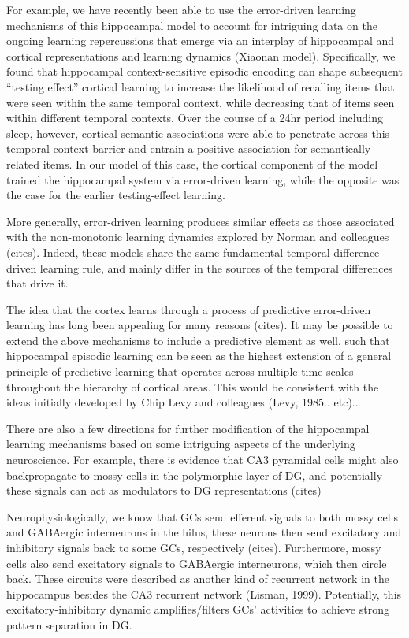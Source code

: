 \documentclass[11pt,twoside]{article}
\newif\myifpdf
\begin{document}
For example, we have recently been able to use the error-driven learning mechanisms of this hippocampal model to account for intriguing data on the ongoing learning repercussions that emerge via an interplay of hippocampal and cortical representations and learning dynamics (Xiaonan model).  Specifically, we found that hippocampal context-sensitive episodic encoding can shape subsequent “testing effect” cortical learning to increase the likelihood of recalling items that were seen within the same temporal context, while decreasing that of items seen within different temporal contexts.  Over the course of a 24hr period including sleep, however, cortical semantic associations were able to penetrate across this temporal context barrier and entrain a positive association for semantically-related items.  In our model of this case, the cortical component of the model trained the hippocampal system via error-driven learning, while the opposite was the case for the earlier testing-effect learning.

More generally, error-driven learning produces similar effects as those associated with the non-monotonic learning dynamics explored by Norman and colleagues (cites).  Indeed, these models share the same fundamental temporal-difference driven learning rule, and mainly differ in the sources of the temporal differences that drive it.

The idea that the cortex learns through a process of predictive error-driven learning has long been appealing for many reasons (cites).  It may be possible to extend the above mechanisms to include a predictive element as well, such that hippocampal episodic learning can be seen as the highest extension of a general principle of predictive learning that operates across multiple time scales throughout the hierarchy of cortical areas.  This would be consistent with the ideas initially developed by Chip Levy and colleagues (Levy, 1985.. etc)..

There are also a few directions for further modification of the hippocampal learning mechanisms based on some intriguing aspects of the underlying neuroscience.  For example, there is evidence that CA3 pyramidal cells might also backpropagate to mossy cells in the polymorphic layer of DG, and potentially these signals can act as modulators to DG representations (cites)

Neurophysiologically, we know that GCs send efferent signals to both mossy cells and GABAergic interneurons in the hilus, these neurons then send excitatory and inhibitory signals back to some GCs, respectively (cites). Furthermore, mossy cells also send excitatory signals to GABAergic interneurons, which then circle back. These circuits were described as another kind of recurrent network in the hippocampus besides the CA3 recurrent network (Lisman, 1999). Potentially, this excitatory-inhibitory dynamic amplifies/filters GCs' activities to achieve strong pattern separation in DG.
\end{document}

